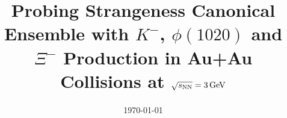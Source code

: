 \documentclass[%
 reprint,	
showpacs,
 amsmath,amssymb,
 aps,
 superscriptaddress,
]{revtex4-1}
\begin{document}

\title{Probing Strangeness Canonical Ensemble with $K^{-}$, $\phi(1020)$ and $\Xi^{-}$ Production in Au+Au Collisions at ${\sqrt{s_{\rm NN}} = \rm{3\,GeV}}$}%



\date{\today}%
\end{document}
